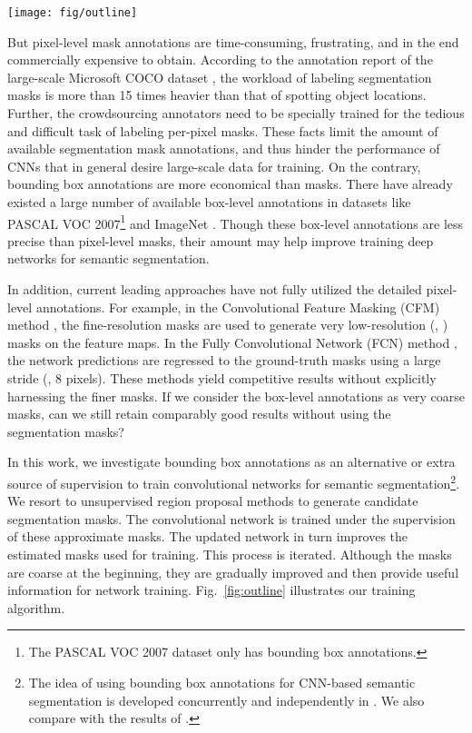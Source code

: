 \documentclass[10pt,twocolumn,letterpaper]{article}
\begin{document}
\begin{figure*}[t]
	\centering
	\texttt{[image: fig/outline]}
	\caption{Overview of our training approach supervised by bounding boxes.}
	\label{fig:outline}
\end{figure*}

But pixel-level mask annotations are time-consuming, frustrating, and in the end commercially expensive to obtain.
According to the annotation report of the large-scale Microsoft COCO dataset \cite{Lin2014}, the workload of labeling segmentation masks is more than 15 times heavier than that of spotting object locations. Further, the crowdsourcing annotators need to be specially trained for the tedious and difficult task of labeling per-pixel masks. These facts limit the amount of available segmentation mask annotations, and thus hinder the performance of CNNs that in general desire large-scale data for training. On the contrary, bounding box annotations are more economical than masks. There have already existed a large number of available box-level annotations in datasets like PASCAL VOC 2007\footnote{The PASCAL VOC 2007 dataset only has bounding box annotations.} \cite{everingham2010pascal} and ImageNet \cite{Russakovsky2014}. Though these box-level annotations are less precise than pixel-level masks, their amount may help improve training deep networks for semantic segmentation.

In addition, current leading approaches have not fully utilized the detailed pixel-level annotations. For example, in the Convolutional Feature Masking (CFM) method \cite{Dai2015}, the fine-resolution masks are used to generate very low-resolution (\eg, ) masks on the feature maps. In the Fully Convolutional Network (FCN) method \cite{Long2015}, the network predictions are regressed to the ground-truth masks using a large stride (\eg, 8 pixels). These methods yield competitive results without explicitly harnessing the finer masks. If we consider the box-level annotations as very coarse masks, can we still retain comparably good results without using the segmentation masks?

In this work, we investigate bounding box annotations as an alternative or extra source of supervision to train convolutional networks for semantic segmentation\footnote{The idea of using bounding box annotations for CNN-based semantic segmentation is developed concurrently and independently in \cite{papandreou2015weakly}. We also compare with the results of \cite{papandreou2015weakly}.}.
We resort to unsupervised region proposal methods \cite{uijlings2013selective,arbelaez2014multiscale} to generate candidate segmentation masks. The convolutional network is trained under the supervision of these approximate masks. The updated network in turn improves the estimated masks used for training. This process is iterated. Although the masks are coarse at the beginning, they are gradually improved and then provide useful information for network training. Fig.~\ref{fig:outline} illustrates our training algorithm.
\end{document}
